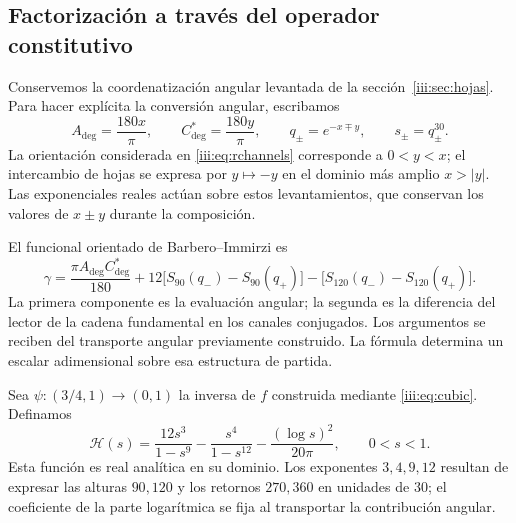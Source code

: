 \subsection{Factorización a través del operador constitutivo}

Conservemos la coordenatización angular levantada de la
sección~\ref{iii:sec:hojas}. Para hacer explícita la conversión angular,
escribamos
\begin{equation}
 A_{\deg}=\frac{180x}{\pi},\qquad
 C^*_{\deg}=\frac{180y}{\pi},\qquad
 q_\pm=e^{-x\mp y},\qquad s_\pm=q_\pm^{30}.
 \label{iii:eq:barbero-angular-lift}
\end{equation}
La orientación considerada en \eqref{iii:eq:rchannels} corresponde a
$0<y<x$; el intercambio de hojas se expresa por $y\mapsto-y$ en el
dominio más amplio $x>|y|$. Las exponenciales reales actúan sobre estos
levantamientos, que conservan los valores de $x\pm y$ durante la
composición.

El funcional orientado de Barbero--Immirzi es
\begin{equation}
 \gamma=\frac{\pi A_{\deg}C^*_{\deg}}{180}
   +12\bigl[S_{90}(q_-)-S_{90}(q_+)\bigr]
   -\bigl[S_{120}(q_-)-S_{120}(q_+)\bigr].
 \label{iii:eq:barbero-functional}
\end{equation}
La primera componente es la evaluación angular; la segunda es la
diferencia del lector de la cadena fundamental en los canales conjugados.
Los argumentos se reciben del transporte angular previamente construido.
La fórmula determina un escalar adimensional sobre esa estructura de
partida.

Sea $\psi:(3/4,1)\to(0,1)$ la inversa de $f$ construida mediante
\eqref{iii:eq:cubic}. Definamos
\begin{equation}
 \mathcal H(s)=\frac{12s^3}{1-s^9}
             -\frac{s^4}{1-s^{12}}
             -\frac{(\log s)^2}{20\pi},\qquad 0<s<1.
 \label{iii:eq:barbero-h}
\end{equation}
Esta función es real analítica en su dominio. Los exponentes $3,4,9,12$
resultan de expresar las alturas $90,120$ y los retornos $270,360$ en
unidades de $30$; el coeficiente de la parte logarítmica se fija al
transportar la contribución angular.

